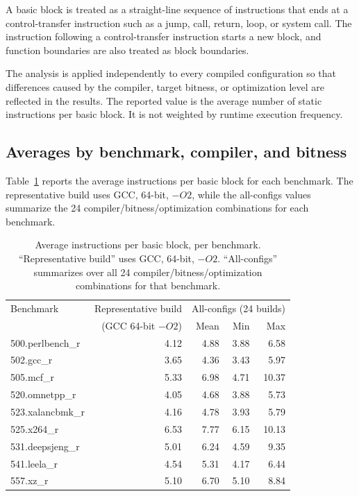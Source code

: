 \documentclass[11pt,a4paper]{article}
\begin{document}
A basic block is treated as a straight-line sequence of instructions that
ends at a control-transfer instruction such as a jump, call, return, loop,
or system call. The instruction following a control-transfer instruction
starts a new block, and function boundaries are also treated as block
boundaries.

The analysis is applied independently to every compiled configuration so
that differences caused by the compiler, target bitness, or optimization
level are reflected in the results. The reported value is the average
number of static instructions per basic block. It is not weighted by
runtime execution frequency.
 
\subsection{Averages by benchmark, compiler, and bitness}

Table~\ref{tab:basicblocks} reports the average instructions per basic block
for each benchmark. The representative build uses GCC, 64-bit, $-O2$,
while the all-configs values summarize the 24 compiler/bitness/optimization
combinations for each benchmark.

\begin{table}[H]
\centering
\caption{Average instructions per basic block, per benchmark. ``Representative build'' uses GCC, 64-bit, $-O2$. ``All-configs'' summarizes over all 24 compiler/bitness/optimization combinations for that benchmark.}
\label{tab:basicblocks}
\begin{tabular}{lrrrr}
\toprule
Benchmark & Representative build & \multicolumn{3}{c}{All-configs (24 builds)} \\
 & (GCC 64-bit $-O2$) & Mean & Min & Max \\
\midrule
500.perlbench\_r & 4.12 & 4.88 & 3.88 & 6.58 \\
502.gcc\_r       & 3.65 & 4.36 & 3.43 & 5.97 \\
505.mcf\_r       & 5.33 & 6.98 & 4.71 & 10.37 \\
520.omnetpp\_r   & 4.05 & 4.68 & 3.88 & 5.73 \\
523.xalancbmk\_r & 4.16 & 4.78 & 3.93 & 5.79 \\
525.x264\_r      & 6.53 & 7.77 & 6.15 & 10.13 \\
531.deepsjeng\_r & 5.01 & 6.24 & 4.59 & 9.35 \\
541.leela\_r     & 4.54 & 5.31 & 4.17 & 6.44 \\
557.xz\_r        & 5.10 & 6.70 & 5.10 & 8.84 \\
\bottomrule
\end{tabular}
\end{table}
\end{document}
